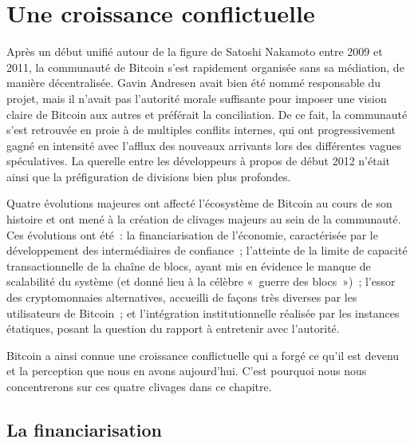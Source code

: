 
\chapter{Une croissance conflictuelle}
\label{ch:clivages}

Après un début unifié autour de la figure de Satoshi Nakamoto entre 2009 et 2011, la communauté de Bitcoin s'est rapidement organisée sans sa médiation, de manière décentralisée. Gavin Andresen avait bien été nommé responsable du projet, mais il n'avait pas l'autorité morale suffisante pour imposer une vision claire de Bitcoin aux autres et préférait la conciliation. De ce fait, la communauté s'est retrouvée en proie à de multiples conflits internes, qui ont progressivement gagné en intensité avec l'afflux des nouveaux arrivants lors des différentes vagues spéculatives. La querelle entre les développeurs à propos de  début 2012 n'était ainsi que la préfiguration de divisions bien plus profondes.

Quatre évolutions majeures ont affecté l'écosystème de Bitcoin au cours de son histoire et ont mené à la création de clivages majeurs au sein de la communauté. Ces évolutions ont été~: la financiarisation de l'économie, caractérisée par le développement des intermédiaires de confiance~; l'atteinte de la limite de capacité transactionnelle de la chaîne de blocs, ayant mis en évidence le manque de scalabilité du système (et donné lieu à la célèbre «~guerre des blocs~»)~; l'essor des cryptomonnaies alternatives, accueilli de façons très diverses par les utilisateurs de Bitcoin~; et l'intégration institutionnelle réalisée par les instances étatiques, posant la question du rapport à entretenir avec l'autorité.

Bitcoin a ainsi connue une croissance conflictuelle qui a forgé ce qu'il est devenu et la perception que nous en avons aujourd'hui. C'est pourquoi nous nous concentrerons sur ces quatre clivages dans ce chapitre.


\section*{La financiarisation} %


